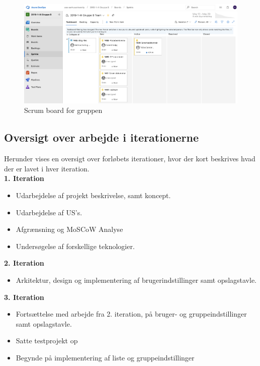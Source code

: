 \begin{figure}[H]
    \centering
    \includegraphics[width=1\linewidth]{07_Metode_og_Proces/Filer/AzureScrumBoard.png}
    \caption{Scrum board for gruppen}
    \label{fig:ScrumBoard}
\end{figure}{}

\subsection{Oversigt over arbejde i iterationerne}
Herunder vises en oversigt over forløbets iterationer, hvor der kort beskrives hvad der er lavet i hver iteration.
\newline \\
\textbf{1. Iteration}
\begin{itemize}
    \item Udarbejdelse af projekt beskrivelse, samt koncept.
    \item Udarbejdelse af US's. 
    \item Afgrænsning og MoSCoW Analyse
    \item Undersøgelse af forskellige teknologier.
\end{itemize}

\textbf{2. Iteration}
\begin{itemize}
    \item Arkitektur, design og implementering af brugerindstillinger samt opslagstavle.
\end{itemize}

\textbf{3. Iteration}
\begin{itemize}
    \item Fortsættelse med arbejde fra 2. iteration, på bruger- og gruppeindstillinger samt opslagstavle.
    \item Satte testprojekt op
    \item Begynde på implementering af liste og gruppeindstillinger
\end{itemize}

